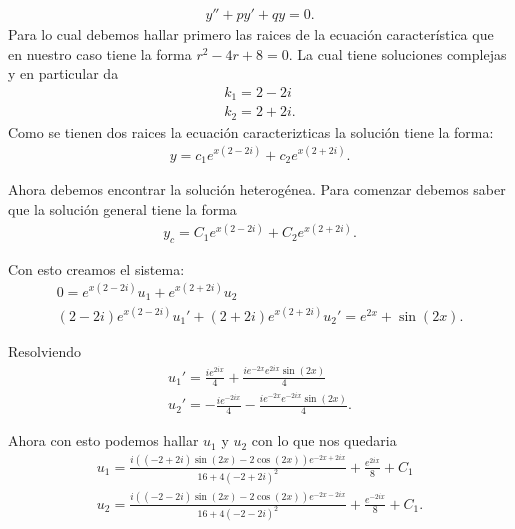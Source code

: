 \begin{enumerate}
\begin{enumerate}
	    \begin{align*}
	      y'' + py'+qy = 0
	    .\end{align*}
	    Para lo cual debemos hallar primero las raices de la ecuación característica que en nuestro caso tiene la forma $r^2-4r+8=0$. La cual tiene soluciones complejas y en particular da
	    \begin{align*}
	      k_1 = 2 - 2i\\
	      k_2 = 2 + 2i
	    .\end{align*}
	    Como se tienen dos raices la ecuación caracterizticas la solución tiene la forma:
	    \begin{align*}
	      y = c_1e^{x\left( 2-2i \right) }+c_2e^{x\left( 2+2i \right) }
	    .\end{align*}

	    Ahora debemos encontrar la solución heterogénea. Para comenzar debemos saber que la solución general tiene la forma
	    \begin{align*}
	      y_c = C_1 e^{x\left( 2-2i \right) }+ C_2e^{x\left( 2+2i \right) }
	    .\end{align*}

	    Con esto creamos el sistema:
	    \begin{align*}
	      0 = e^{x\left( 2-2i \right) }u_1 + e^{x\left( 2+2i \right) }u_2\\
	      \left( 2-2i \right) e^{x\left( 2-2i \right) }u_1' + \left( 2+2i \right) e^{x\left( 2+2i \right) }u_2' = e^{2x}+\sin\left( 2x \right) 
	    .\end{align*}

	    Resolviendo
	    \begin{align*}
	      u_1' = \frac{ie^{2ix}}{4}+\frac{ie^{-2x}e^{2ix}\sin\left( 2x \right) }{4}\\
	      u_2' = - \frac{ie^{-2ix}}{4}-\frac{ie^{-2x}e^{-2ix}\sin\left( 2x \right) }{4} 
	    .\end{align*}

	    Ahora con esto podemos hallar $u_1$ y $u_2$ con lo que nos quedaria
	    \begin{align*}
	      u_1 = \frac{i\left( \left( -2+2i \right) \sin\left( 2x \right) -2\cos\left( 2x \right)  \right) e^{-2x+2ix}}{16+4\left( -2+2i \right)^2}+\frac{e^{2ix}}{8}+C_1\\
	      u_2 = \frac{i\left( \left( -2-2i \right) \sin\left( 2x \right) -2\cos\left( 2x \right)  \right) e^{-2x-2ix}}{16+4\left( -2-2i \right)^2}+\frac{e^{-2ix}}{8}+C_1
	    .\end{align*}


\end{enumerate}
\end{enumerate}
